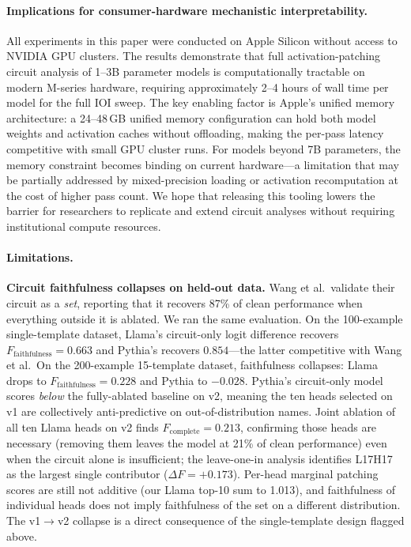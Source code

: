 \documentclass[11pt,a4paper]{article}
\begin{document}
\paragraph{Implications for consumer-hardware mechanistic interpretability.}
All experiments in this paper were conducted on Apple Silicon without access to NVIDIA
GPU clusters. The results demonstrate that full activation-patching circuit analysis of
1--3B parameter models is computationally tractable on modern M-series hardware,
requiring approximately 2--4 hours of wall time per model for the full IOI sweep. The
key enabling factor is Apple's unified memory architecture: a 24--48\,GB unified
memory configuration can hold both model weights and activation caches without
offloading, making the per-pass latency competitive with small GPU cluster runs. For
models beyond 7B parameters, the memory constraint becomes binding on current
hardware---a limitation that may be partially addressed by mixed-precision loading or
activation recomputation at the cost of higher pass count. We hope that releasing this
tooling lowers the barrier for researchers to replicate and extend circuit analyses
without requiring institutional compute resources.

\paragraph{Limitations.}

\textbf{Circuit faithfulness collapses on held-out data.} Wang et al.\ validate their
circuit as a \emph{set}, reporting that it recovers 87\% of clean performance when
everything outside it is ablated. We ran the same evaluation. On the
100-example single-template dataset, Llama's circuit-only logit difference recovers
$F_\text{faithfulness} = 0.663$ and Pythia's recovers $0.854$---the latter competitive
with Wang et al.\ On the 200-example 15-template dataset, faithfulness collapses: Llama drops to $F_\text{faithfulness} = 0.228$ and
Pythia to $-0.028$. Pythia's circuit-only model scores \emph{below} the
fully-ablated baseline on v2, meaning the ten heads selected on v1 are collectively
anti-predictive on out-of-distribution names. Joint ablation of all ten Llama heads on
v2 finds $F_\text{complete} = 0.213$, confirming those heads are necessary (removing
them leaves the model at 21\% of clean performance) even when the circuit alone is
insufficient; the leave-one-in analysis identifies L17H17 as the largest single
contributor ($\Delta F = +0.173$). Per-head marginal patching scores are still not
additive (our Llama top-10 sum to 1.013), and faithfulness of individual heads does
not imply faithfulness of the set on a different distribution. The v1$\to$v2 collapse
is a direct consequence of the single-template design flagged above.
\end{document}
